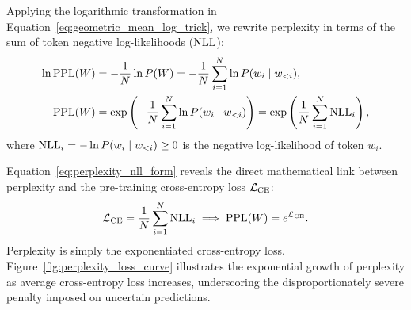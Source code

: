 \documentclass[../../main.tex]{subfiles}
\begin{document}
Applying the logarithmic transformation in Equation~\eqref{eq:geometric_mean_log_trick}, we rewrite perplexity in terms of the sum of token negative log-likelihoods ($\mathrm{NLL}$):
\begin{align}
\ln \mathrm{PPL}(W) &= -\frac{1}{N} \ln P(W) = -\frac{1}{N} \sum_{i=1}^N \ln P(w_i \mid w_{<i}), \\
\label{eq:perplexity_nll_form}
\mathrm{PPL}(W) &= \exp\left( -\frac{1}{N} \sum_{i=1}^N \ln P(w_i \mid w_{<i}) \right) = \exp\left( \frac{1}{N} \sum_{i=1}^N \mathrm{NLL}_i \right),
\end{align}
where $\mathrm{NLL}_i = -\ln P(w_i \mid w_{<i}) \ge 0$ is the negative log-likelihood of token $w_i$.

Equation~\eqref{eq:perplexity_nll_form} reveals the direct mathematical link between perplexity and the pre-training cross-entropy loss $\mathcal{L}_{\text{CE}}$:
\begin{equation}
\label{eq:perplexity_cross_entropy_equiv}
\mathcal{L}_{\text{CE}} = \frac{1}{N} \sum_{i=1}^N \mathrm{NLL}_i \implies \mathrm{PPL}(W) = e^{\mathcal{L}_{\text{CE}}}.
\end{equation}
Perplexity is simply the exponentiated cross-entropy loss. Figure~\ref{fig:perplexity_loss_curve} illustrates the exponential growth of perplexity as average cross-entropy loss increases, underscoring the disproportionately severe penalty imposed on uncertain predictions.
\end{document}
